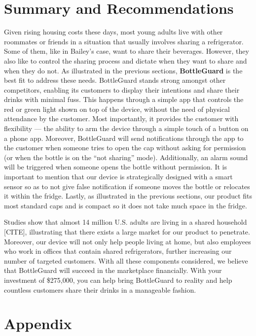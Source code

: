 \documentclass[12pt]{article}
\begin{document}
	\section*{Summary and Recommendations}
		
		Given rising housing costs these days, most young adults live with other roommates or friends in a situation that usually involves sharing a refrigerator. Some of them, like in Bailey’s case, want to share their beverages. However, they also like to control the sharing process and dictate when they want to share and when they do not. As illustrated in the previous sections, \textbf{BottleGuard} is the best fit to address these needs. BottleGuard stands strong amongst other competitors, enabling its customers to display their intentions and share their drinks with minimal fuss. This happens through a simple app that controls the red or green light shown on top of the device, without the need of physical attendance by the customer. Most importantly, it provides the customer with flexibility — the ability to arm the device through a simple touch of a button on a phone app. Moreover, BottleGuard will send notifications through the app to the customer when someone tries to open the cap without asking for permission (or when the bottle is on the “not sharing” mode). Additionally, an alarm sound will be triggered when someone opens the bottle without permission. It is important to mention that our device is strategically designed with a smart sensor so as to not give false notification if someone moves the bottle or relocates it within the fridge. Lastly, as illustrated in the previous sections, our product fits most standard caps and is compact so it does not take much space in the fridge. 
		
		Studies show that almost 14 million U.S. adults are living in a shared household [CITE], illustrating that there exists a large market for our product to penetrate. Moreover, our device will not only help people living at home, but also employees who work in offices that contain shared refrigerators, further increasing our number of targeted customers. With all these components considered, we believe that BottleGuard will succeed in the marketplace financially. With your investment of \$275,000, you can help bring BottleGuard to reality and help countless customers share their drinks in a manageable fashion.

		
		\newpage
		\section*{Appendix}
\end{document}
